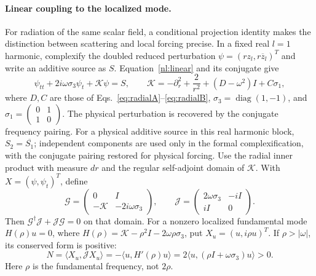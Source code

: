 \paragraph{Linear coupling to the localized mode.}
For radiation of the same scalar field, a conditional projection identity
makes the distinction between scattering and local forcing precise.
In a fixed real $l=1$ harmonic, complexify the doubled reduced perturbation
$\psi=(rz_l,r\overline z_l)^T$ and write an additive source as $S$.
Equation~\eqref{nl:linear} and its conjugate give
\begin{equation}
 \psi_{tt}+2i\omega\sigma_3\psi_t+\mathcal K\psi=S,
 \qquad
 \mathcal K=-\partial_r^2+\frac{2}{r^2}
 +(D-\omega^2)I+C\sigma_1,
 \label{env:time}
\end{equation}
where $D,C$ are those of Eqs.~\eqref{eq:radialA}--\eqref{eq:radialB},
$\sigma_3=\operatorname{diag}(1,-1)$, and
$\sigma_1=\left(\begin{smallmatrix}0&1\\1&0\end{smallmatrix}\right)$.
The physical perturbation is recovered by the conjugate frequency pairing.
For a physical additive source in this real harmonic block,
$S_2=\overline{S_1}$; independent components are used only in the formal
complexification, with the conjugate pairing restored for physical forcing.
Use the radial inner product with measure $dr$ and the regular
self-adjoint domain of $\mathcal K$. With $X=(\psi,\psi_t)^T$, define
\begin{equation}
 \mathcal G=\begin{pmatrix}0&I\\-\mathcal K&-2i\omega\sigma_3\end{pmatrix},
 \qquad
 \mathcal J=\begin{pmatrix}2\omega\sigma_3&-iI\\iI&0\end{pmatrix}.
 \label{env:generator}
\end{equation}
Then $\mathcal G^\dagger\mathcal J+\mathcal J\mathcal G=0$ on that domain.
For a nonzero localized fundamental mode
$H(\rho)u=0$, where $H(\rho)=\mathcal K-\rho^2I-2\omega\rho\sigma_3$,
put $X_u=(u,i\rho u)^T$. If $\rho>|\omega|$, its conserved form is positive:
\begin{equation}
 N=\langle X_u,\mathcal JX_u\rangle
   =-\langle u,H'(\rho)u\rangle
   =2\langle u,(\rho I+\omega\sigma_3)u\rangle>0.
 \label{env:norm}
\end{equation}
Here $\rho$ is the fundamental frequency, not $2\rho$.
